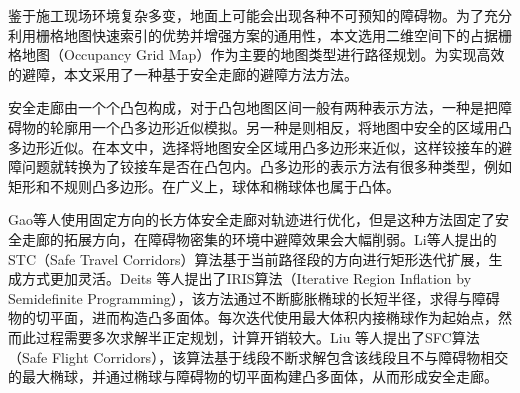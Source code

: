 \documentclass[master,academic]{ysuthesis} %
\begin{document}
	鉴于施工现场环境复杂多变，地面上可能会出现各种不可预知的障碍物。为了充分利用栅格地图快速索引的优势并增强方案的通用性，本文选用二维空间下的占据栅格地图（Occupancy Grid Map）作为主要的地图类型进行路径规划。为实现高效的避障，本文采用了一种基于安全走廊的避障方法方法。
	
	安全走廊由一个个凸包构成，对于凸包地图区间一般有两种表示方法，一种是把障碍物的轮廓用一个凸多边形近似模拟。另一种是则相反，将地图中安全的区域用凸多边形近似。在本文中，选择将地图安全区域用凸多边形来近似，这样铰接车的避障问题就转换为了铰接车是否在凸包内。凸多边形的表示方法有很多种类型，例如矩形和不规则凸多边形。在广义上，球体和椭球体也属于凸体。
	
	Gao等人使用固定方向的长方体安全走廊对轨迹进行优化，但是这种方法固定了安全走廊的拓展方向，在障碍物密集的环境中避障效果会大幅削弱。Li等人提出的STC（Safe Travel Corridors）算法基于当前路径段的方向进行矩形迭代扩展，生成方式更加灵活。Deits 等人提出了IRIS算法（Iterative Region Inflation by Semidefinite Programming），该方法通过不断膨胀椭球的长短半径，求得与障碍物的切平面，进而构造凸多面体。每次迭代使用最大体积内接椭球作为起始点，然而此过程需要多次求解半正定规划，计算开销较大。Liu 等人提出了SFC算法（Safe Flight Corridors），该算法基于线段不断求解包含该线段且不与障碍物相交的最大椭球，并通过椭球与障碍物的切平面构建凸多面体，从而形成安全走廊。
	
\end{document}
